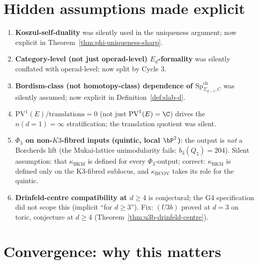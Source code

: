\documentclass[11pt]{article}
\theoremstyle{definition}
\providecommand{\SpCh}{\mathrm{Sp}^{\mathrm{ch}}}
\providecommand{\kBKM}{\kappa_{\mathrm{BKM}}}
\providecommand{\PV}{\mathrm{PV}}
\begin{document}
\section*{Hidden assumptions made explicit}

\begin{enumerate}[leftmargin=*]
\item \textbf{Koszul-self-duality} was silently used in the uniqueness
argument; now explicit in Theorem~\ref{thm:phi-uniqueness-sharp}.

\item \textbf{Category-level (not just operad-level) $E_d$-formality}
was silently conflated with operad-level; now split by Cycle 3.

\item \textbf{Bordism-class (not homotopy-class) dependence of
$\SpCh_{\Sigma_{d-1}, C}$} was silently assumed; now explicit
in Definition~\ref{def:slab-d}.

\item \textbf{$\PV^1(E) / \text{translations} = 0$} (not just
$\PV^1(E) = \C$) drives the $n(d = 1) = \infty$ stratification; the
translation quotient was silent.

\item \textbf{$\Phi_3$ on non-$K3$-fibred inputs (quintic, local $\bP^2$)}:
the output is \emph{not} a Borcherds lift (the Mukai-lattice
unimodularity fails: $b_3(Q_5) = 204$). Silent assumption: that
$\kBKM$ is defined for every $\Phi_3$-output; correct: $\kBKM$ is
defined only on the K3-fibred sublocus, and $\kappa_{\mathrm{BCOV}}$ takes
its role for the quintic.

\item \textbf{Drinfeld-centre compatibility at $d \geq 4$} is conjectural;
the G4 specification did not scope this (implicit ``for $d \geq 3$'').
Fix: $(U3b)$ proved at $d = 3$ on toric, conjecture at $d \geq 4$
(Theorem~\ref{thm:u3b-drinfeld-centre}).
\end{enumerate}

\section*{Convergence: why this matters}
\end{document}
